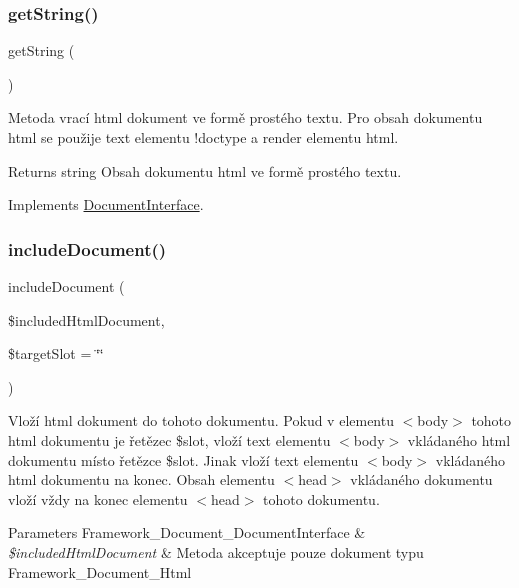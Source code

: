 \subsubsection{\texorpdfstring{get\+String()}{getString()}}
{\footnotesize\ttfamily get\+String (\begin{DoxyParamCaption}{ }\end{DoxyParamCaption})}

Metoda vrací html dokument ve formě prostého textu. Pro obsah dokumentu html se použije text elementu !doctype a render elementu html.

\begin{DoxyReturn}{Returns}
string Obsah dokumentu html ve formě prostého textu. 
\end{DoxyReturn}


Implements \mbox{\hyperlink{interface_pes_1_1_document_1_1_document_interface}{Document\+Interface}}.

\mbox{\label{class_pes_1_1_document_1_1_html_document_aaf106127065467c555cf95ff68ba7ed0}} 
\subsubsection{\texorpdfstring{include\+Document()}{includeDocument()}}
{\footnotesize\ttfamily include\+Document (\begin{DoxyParamCaption}\item[{Framework\+\_\+\+Document\+\_\+\+Document\+Interface}]{\$included\+Html\+Document,  }\item[{}]{\$target\+Slot = {\ttfamily \char`\"{}\char`\"{}} }\end{DoxyParamCaption})}

Vloží html dokument do tohoto dokumentu. Pokud v elementu \textquotesingle{}$<$body$>$\textquotesingle{} tohoto html dokumentu je řetězec \$slot, vloží text elementu \textquotesingle{}$<$body$>$\textquotesingle{} vkládaného html dokumentu místo řetězce \$slot. Jinak vloží text elementu \textquotesingle{}$<$body$>$\textquotesingle{} vkládaného html dokumentu na konec. Obsah elementu \textquotesingle{}$<$head$>$\textquotesingle{} vkládaného dokumentu vloží vždy na konec elementu \textquotesingle{}$<$head$>$\textquotesingle{} tohoto dokumentu. 
\begin{DoxyParams}[1]{Parameters}
Framework\+\_\+\+Document\+\_\+\+Document\+Interface & {\em \$included\+Html\+Document} & Metoda akceptuje pouze dokument typu Framework\+\_\+\+Document\+\_\+\+Html \\
\hline
\end{DoxyParams}

